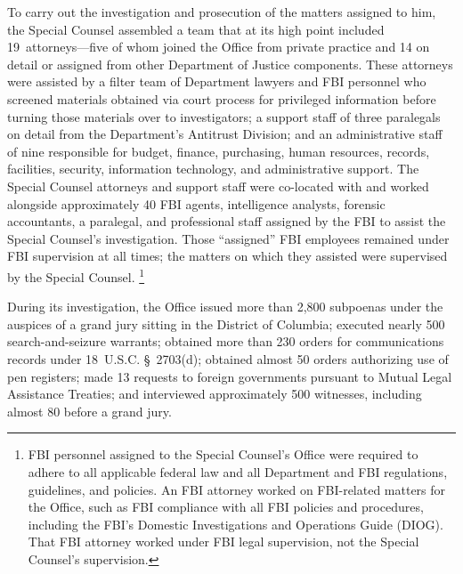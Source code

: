 To carry out the investigation and prosecution of the matters assigned to him, the Special Counsel assembled a team that at its high point included 19~attorneys---five of whom joined the Office from private practice and 14 on detail or assigned from other Department of Justice components.
These attorneys were assisted by a filter team of Department lawyers and FBI personnel who screened materials obtained via court process for privileged information before turning those materials over to investigators; a support staff of three paralegals on detail from the Department's Antitrust Division; and an administrative staff of nine responsible for budget, finance, purchasing, human resources, records, facilities, security, information technology, and administrative support.
The Special Counsel attorneys and support staff were co-located with and worked alongside approximately 40 FBI agents, intelligence analysts, forensic accountants, a paralegal, and professional staff assigned by the FBI to assist the Special Counsel's investigation.
Those ``assigned'' FBI employees remained under FBI supervision at all times; the matters on which they assisted were supervised by the Special Counsel.%
\footnote{FBI personnel assigned to the Special Counsel's Office were required to adhere to all applicable federal law and all Department and FBI regulations, guidelines, and policies.
An FBI attorney worked on FBI-related matters for the Office, such as FBI compliance with all FBI policies and procedures, including the FBI's Domestic Investigations and Operations Guide (DIOG).
That FBI attorney worked under FBI legal supervision, not the Special Counsel's supervision.}

During its investigation, the Office issued more than 2,800 subpoenas under the auspices of a grand jury sitting in the District of Columbia; executed nearly 500 search-and-seizure warrants; obtained more than 230 orders for communications records under 18~U.S.C. \S~2703(d); obtained almost 50 orders authorizing use of pen registers; made 13 requests to foreign governments pursuant to Mutual Legal Assistance Treaties; and interviewed approximately 500 witnesses, including almost 80 before a grand jury.

\hr

